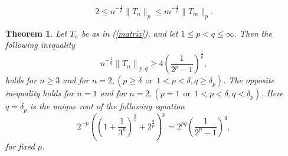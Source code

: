 \documentclass[10pt,a4paper]{amsart}
\newtheorem{theorem}{Theorem}
\begin{document}
\begin{equation}\label{generalineq1}
   2\leq n^{-\frac{1}{p}}\|T_n\|_{p}\leq m^{-\frac{1}{p}}\|T_m\|_{p}.
\end{equation}

\begin{theorem}\label{mainthm1}
Let $T_n$ be as in (\ref{matrix}), and let $1\leq p<q\leq\infty$. Then the following inequality
\begin{equation}\label{mainthmeq1}
n^{-\frac{1}{q}}\left\|T_{n}\right\|_{p,q}\geq 4\left(\frac{1}{2^{p}-1}\right)^{\frac{1}{p}}, 
\end{equation}
holds for $n\geq3$ and for $n=2, (p\geq\delta~~\text{or}~~1<p<\delta, q\geq \delta_p)$. The opposite inequality holds for $n=1$ and for $n=2, (p=1~~\text{or}~~1< p<\delta, q<\delta_p )$. Here $q=\delta_p$ is the unique root of the following equation
\begin{equation}\label{delta}
2^{-p}\left(\left(1+\frac{1}{3^p}\right)^\frac{q}{p}+2^\frac{q}{p}\right)^p=2^{pq}\left(\frac{1}{2^p-1}\right)^q,
\end{equation}
for fixed $p$. 
\end{theorem}
\end{document}
